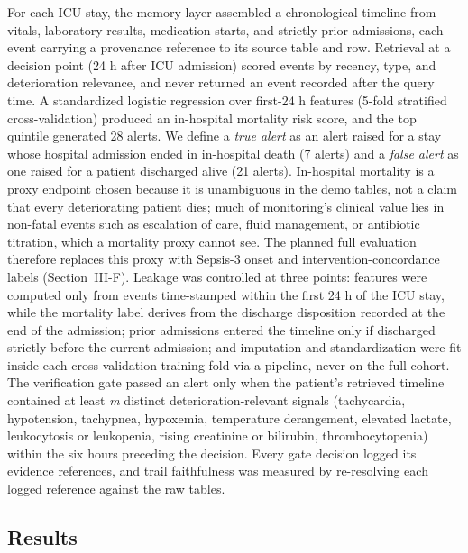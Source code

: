 For each ICU stay, the memory layer assembled a chronological timeline from vitals, laboratory
results, medication starts, and strictly prior admissions, each event carrying a provenance
reference to its source table and row. Retrieval at a decision point (24 h after ICU
admission) scored events by recency, type, and deterioration relevance, and never returned an
event recorded after the query time. A standardized logistic regression over first-24 h
features (5-fold stratified cross-validation) produced an in-hospital mortality risk score,
and the top quintile generated 28 alerts. We define a \emph{true alert} as an alert raised for a
stay whose hospital admission ended in in-hospital death (7 alerts) and a \emph{false alert} as
one raised for a patient discharged alive (21 alerts). In-hospital mortality is a proxy
endpoint chosen because it is unambiguous in the demo tables, not a claim that every
deteriorating patient dies; much of monitoring's clinical value lies in non-fatal events
such as escalation of care, fluid management, or antibiotic titration, which a mortality
proxy cannot see. The planned full evaluation therefore replaces this proxy with Sepsis-3
onset and intervention-concordance labels (Section~III-F). Leakage was controlled at three points: features were computed
only from events time-stamped within the first 24 h of the ICU stay, while the mortality
label derives from the discharge disposition recorded at the end of the admission; prior
admissions entered the timeline only if discharged strictly before the current admission;
and imputation and standardization were fit inside each cross-validation training fold via a
pipeline, never on the full cohort. The verification gate passed an alert only when the patient's retrieved timeline
contained at least \emph{m} distinct deterioration-relevant signals (tachycardia, hypotension,
tachypnea, hypoxemia, temperature derangement, elevated lactate, leukocytosis or leukopenia,
rising creatinine or bilirubin, thrombocytopenia) within the six hours preceding the decision.
Every gate decision logged its evidence references, and trail faithfulness was measured by
re-resolving each logged reference against the raw tables.

\subsection{Results}

